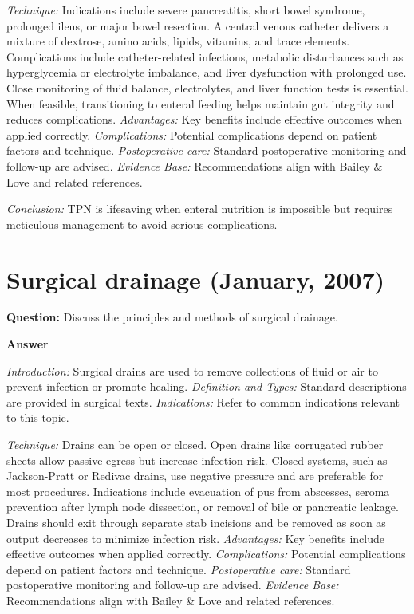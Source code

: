 \documentclass{article}
\begin{document}
\emph{Technique:} Indications include severe pancreatitis, short bowel syndrome, prolonged ileus, or major bowel resection. A central venous catheter delivers a mixture of dextrose, amino acids, lipids, vitamins, and trace elements. Complications include catheter-related infections, metabolic disturbances such as hyperglycemia or electrolyte imbalance, and liver dysfunction with prolonged use. Close monitoring of fluid balance, electrolytes, and liver function tests is essential. When feasible, transitioning to enteral feeding helps maintain gut integrity and reduces complications.
\emph{Advantages:} Key benefits include effective outcomes when applied correctly.
\emph{Complications:} Potential complications depend on patient factors and technique.
\emph{Postoperative care:} Standard postoperative monitoring and follow-up are advised.
\emph{Evidence Base:} Recommendations align with Bailey \& Love and related references.

\emph{Conclusion:} TPN is lifesaving when enteral nutrition is impossible but requires meticulous management to avoid serious complications.


\section{Surgical drainage (January, 2007)}

\textbf{Question:} Discuss the principles and methods of surgical drainage.

\textbf{Answer}

\emph{Introduction:} Surgical drains are used to remove collections of fluid or air to prevent infection or promote healing.
\emph{Definition and Types:} Standard descriptions are provided in surgical texts.
\emph{Indications:} Refer to common indications relevant to this topic.

\emph{Technique:} Drains can be open or closed. Open drains like corrugated rubber sheets allow passive egress but increase infection risk. Closed systems, such as Jackson-Pratt or Redivac drains, use negative pressure and are preferable for most procedures. Indications include evacuation of pus from abscesses, seroma prevention after lymph node dissection, or removal of bile or pancreatic leakage. Drains should exit through separate stab incisions and be removed as soon as output decreases to minimize infection risk.
\emph{Advantages:} Key benefits include effective outcomes when applied correctly.
\emph{Complications:} Potential complications depend on patient factors and technique.
\emph{Postoperative care:} Standard postoperative monitoring and follow-up are advised.
\emph{Evidence Base:} Recommendations align with Bailey \& Love and related references.
\end{document}
